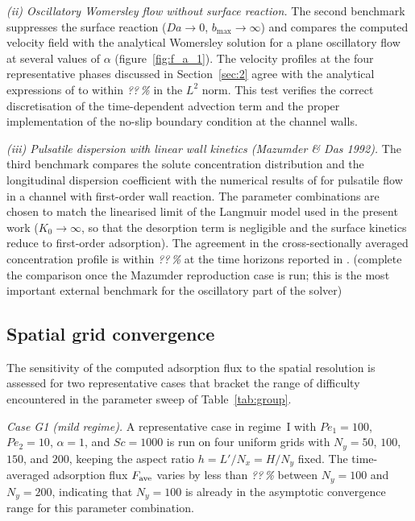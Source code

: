 \documentclass[lineno]{JFM-FLM_Au}
\begin{document}
\medskip
\noindent\textit{(ii) Oscillatory Womersley flow without surface
reaction.}
The second benchmark suppresses the surface reaction
($Da \to 0$, $b_{\max} \to \infty$) and compares the computed velocity
field with the analytical Womersley solution for a plane oscillatory
flow at several values of $\alpha$
(figure~\ref{fig:f_a_1}). The velocity profiles at the four
representative phases discussed in Section~\ref{sec:2} agree with the
analytical expressions of \cite{ma2017theoretical} to within
\textit{??\,\%} in the $L^{2}$ norm. This test verifies the correct
discretisation of the time-dependent advection term and the proper
implementation of the no-slip boundary condition at the channel walls.
 
\medskip
\noindent\textit{(iii) Pulsatile dispersion with linear wall kinetics
(Mazumder \& Das 1992).}
The third benchmark compares the solute concentration distribution and
the longitudinal dispersion coefficient with the numerical results of
\cite{mazumder1992effect} for pulsatile flow in a channel with
first-order wall reaction. The parameter combinations are chosen to
match the linearised limit of the Langmuir model used in the present
work ($K_{0} \to \infty$, so that the desorption term is negligible
and the surface kinetics reduce to first-order adsorption). The
agreement in the cross-sectionally averaged concentration profile is
within \textit{??\,\%} at the time horizons reported in
\citep{mazumder1992effect}. {\color{magenta}(complete the comparison
once the Mazumder reproduction case is run; this is the most important
external benchmark for the oscillatory part of the solver)}
 
\subsection{Spatial grid convergence}
\label{sec:appA_grid}
 
The sensitivity of the computed adsorption flux to the spatial
resolution is assessed for two representative cases that bracket the
range of difficulty encountered in the parameter sweep of
Table~\ref{tab:group}.
 
\medskip
\noindent\textit{Case G1 (mild regime).}
A representative case in regime~I with $Pe_{1} = 100$, $Pe_{2} = 10$,
$\alpha = 1$, and $Sc = 1000$ is run on four uniform grids with
$N_{y} = 50$, $100$, $150$, and $200$, keeping the aspect ratio
$h = L'/N_{x} = H/N_{y}$ fixed. The time-averaged adsorption flux
$F_{\rm ave}$ varies by less than \textit{??\,\%} between $N_{y} = 100$
and $N_{y} = 200$, indicating that $N_{y} = 100$ is already in the
asymptotic convergence range for this parameter combination.
 
\end{document}
